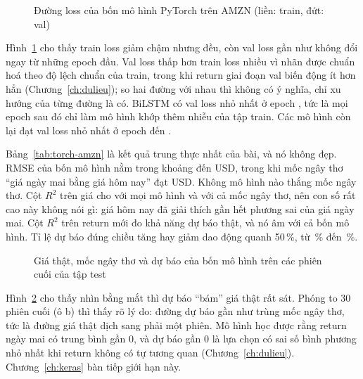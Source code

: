 \begin{figure}[H]
  \centering
  \caption{Đường loss của bốn mô hình PyTorch trên AMZN (liền: train, đứt: val)}
  \label{fig:loss-amzn}
\end{figure}

Hình~\ref{fig:loss-amzn} cho thấy train loss giảm chậm nhưng đều, còn val loss gần như không đổi ngay từ những epoch
đầu. Val loss thấp hơn train loss nhiều vì nhãn được chuẩn hoá theo độ lệch chuẩn của train, trong khi return giai đoạn
val biến động ít hơn hẳn (Chương~\ref{ch:dulieu}); so hai đường với nhau thì không có ý nghĩa, chỉ xu hướng của từng
đường là có. BiLSTM có val loss nhỏ nhất ở epoch , tức là mọi epoch sau đó chỉ
làm mô hình khớp thêm nhiễu của tập train. Các mô hình còn lại đạt val loss nhỏ nhất ở epoch
 đến .

\begin{table}[H]
  \centering\footnotesize
  \caption{Bốn mô hình PyTorch trên tập test AMZN ( đến )}
  \label{tab:torch-amzn}
  
\end{table}

Bảng~\ref{tab:torch-amzn} là kết quả trung thực nhất của bài, và nó không đẹp. RMSE của bốn mô hình nằm trong khoảng
 đến  USD, trong khi mốc ngây thơ ``giá ngày mai bằng
giá hôm nay'' đạt  USD. Không mô hình nào thắng mốc ngây thơ. Cột $R^2$ trên giá cho
 với mọi mô hình và với cả mốc ngây thơ, nên con số rất cao này không nói gì: giá hôm
nay đã giải thích gần hết phương sai của giá ngày mai. Cột $R^2$ trên return mới đo khả năng dự báo thật, và nó âm với
cả bốn mô hình. Tỉ lệ dự báo đúng chiều tăng hay giảm dao động quanh 50\,\%, từ
\,\% đến \,\%.

\begin{figure}[H]
  \centering
  \caption{Giá thật, mốc ngây thơ và dự báo của bốn mô hình trên các phiên cuối của tập test}
  \label{fig:pred-amzn}
\end{figure}

Hình~\ref{fig:pred-amzn} cho thấy nhìn bằng mắt thì dự báo ``bám'' giá thật rất sát. Phóng to 30 phiên cuối (ô b) thì
thấy rõ lý do: đường dự báo gần như trùng mốc ngây thơ, tức là đường giá thật dịch sang phải một phiên. Mô hình học được
rằng return ngày mai có trung bình gần 0, và dự báo gần 0 là lựa chọn có sai số bình phương nhỏ nhất khi return không có
tự tương quan (Chương~\ref{ch:dulieu}). Chương~\ref{ch:keras} bàn tiếp giới hạn này.

